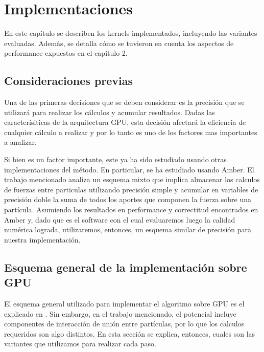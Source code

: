 \chapter{Implementaciones}

\begin{comment}
Aca describo el kernel y aspectos relevantes de las versiones implementadas:
-que variables tengo que tener en cuenta en las implementaciones(por ej. el tamaño de la tabla,el rango, etc)
-que resultados espero!
-como afecta la periodicidad. la describo aca o en la parte de resultados??
-como afecta el tamaño de los bloques
\end{comment}

En este capítulo se describen los kernels implementados, incluyendo las variantes evaluadas. Además, se detalla cómo se tuvieron en cuenta los aspectos de performance expuestos en el capítulo 2.



\section{Consideraciones previas}

Una de las primeras decisiones que se deben considerar es la precisión que se utilizará para realizar los cálculos y acumular resultados. Dadas las caracterísiticas de la arquitectura GPU, esta decisión afectará la eficiencia de cualquier cálculo a realizar y por lo tanto es uno de los factores mas importantes a analizar.

Si bien es un factor importante, este ya ha sido estudiado usando otras implementaciones del método.  En particular, se ha estudiado usando Amber\cite{le2013spfp}. El trabajo mencionado analiza un esquema mixto que implica almacenar los calculos de fuerzas entre particulas utilizando precisión simple y acumular en variables de precisión doble la suma de todos los aportes que componen la fuerza sobre una partícula. Asumiendo los resultados en performance y correctitud encontrados en Amber y,
dado que es el software con el cual evaluaremos luego la calidad numérica lograda, utilizaremos, entonces, un esquema similar de precisión para nuestra implementación.



\section{Esquema general de la implementación sobre GPU}
El esquema general utilizado para implementar el algoritmo sobre GPU es el explicado en \cite{friedrichs2009accelerating}. Sin embargo, en el trabajo mencionado, el potencial incluye componentes de interacción de unión entre partículas, 
por lo que los calculos requeridos son algo distintos. En esta sección se explica, entonces, cuales son las variantes que utilizamos para realizar cada paso.

